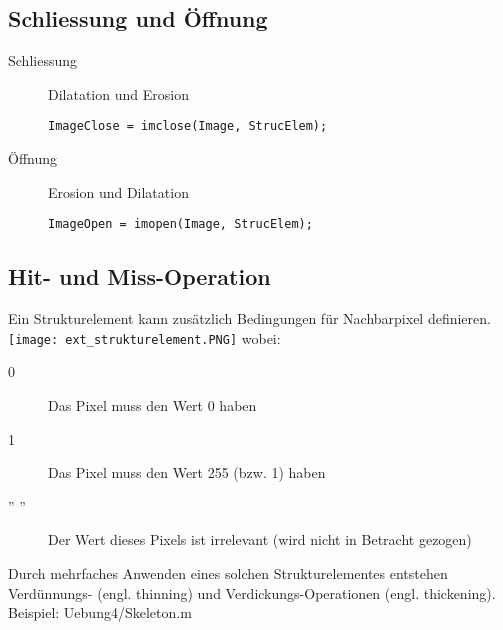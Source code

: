 \subsection{Schliessung und Öffnung}
\begin{description}
    \item[Schliessung] Dilatation und Erosion\\
\begin{lstlisting}
ImageClose = imclose(Image, StrucElem);
\end{lstlisting}
    \item[Öffnung] Erosion und Dilatation
\begin{lstlisting}
ImageOpen = imopen(Image, StrucElem);
\end{lstlisting}
\end{description}

\subsection{Hit- und Miss-Operation}
Ein Strukturelement kann zusätzlich Bedingungen für Nachbarpixel definieren.
\texttt{[image: ext\_strukturelement.PNG]}
wobei:
\begin{description}
    \item[0] Das Pixel muss den Wert 0 haben
    \item[1] Das Pixel muss den Wert 255 (bzw. 1) haben
    \item['' ''] Der Wert dieses Pixels ist irrelevant (wird nicht in Betracht gezogen)
\end{description}
Durch mehrfaches Anwenden eines solchen Strukturelementes entstehen Verdünnungs- (engl. thinning) und Verdickungs-Operationen (engl. thickening).\\
Beispiel: Uebung4/Skeleton.m